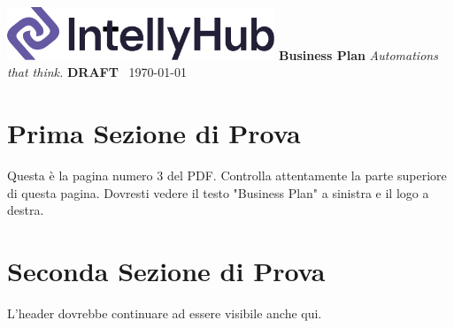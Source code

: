 \documentclass[11pt, a4paper, oneside]{article}
\begin{document}
\begin{titlepage}
    \thispagestyle{empty} 
    \centering
    \vspace*{1cm}
    \includegraphics[width=0.6\textwidth]{IntellyHub_Logo_Colored.png}
    \vspace{2.5cm}
    {\Huge\bfseries\color{PrimaryColor}Business Plan}
    \vspace{1.5cm}
    {\Large\itshape\lightfont Automations that think.}
    \vfill
    {\large\bfseries\color{PrimaryColor}DRAFT} \
    {\large \today}
\end{titlepage}

\tableofcontents
\newpage

\section{Prima Sezione di Prova}
Questa è la pagina numero 3 del PDF. Controlla attentamente la parte superiore di questa pagina. Dovresti vedere il testo "Business Plan" a sinistra e il logo a destra.
\lipsum[1-3]

\section{Seconda Sezione di Prova}
L'header dovrebbe continuare ad essere visibile anche qui.
\lipsum[4-5]
\end{document}
